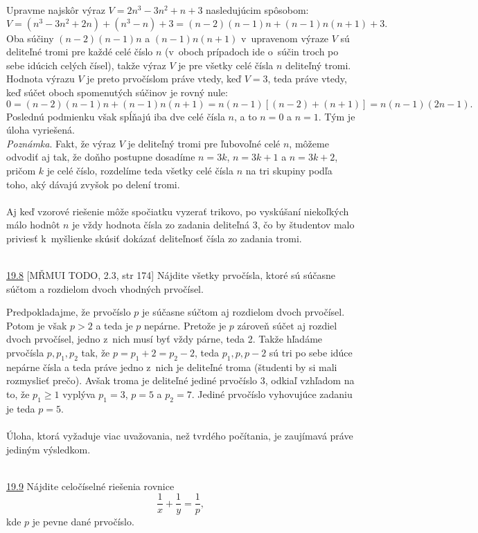 Upravme najskôr výraz $V = 2n^3 - 3n^2 + n + 3$ nasledujúcim spôsobom:
$$V = (n^3 - 3n^2+ 2n) + (n^3 - n) + 3 = (n - 2)(n - 1)n + (n - 1)n(n + 1) + 3.$$
Oba súčiny $(n-2)(n-1)n$ a $(n-1)n(n+1)$ v~upravenom výraze $V$ sú deliteľné tromi pre každé celé číslo $n$ (v~oboch prípadoch ide o~súčin troch po sebe idúcich celých čísel), takže výraz $V$ je pre všetky celé čísla $n$ deliteľný tromi. Hodnota výrazu $V$ je preto prvočíslom práve vtedy, keď $V = 3$, teda práve vtedy, keď súčet oboch spomenutých súčinov je rovný nule:
$$0 = (n - 2)(n - 1)n + (n - 1)n(n + 1) = n(n - 1)[(n - 2) + (n + 1)] = n(n - 1)(2n - 1).$$
Poslednú podmienku však spĺňajú iba dve celé čísla $n$, a to $n = 0$ a $n = 1$. Tým je úloha vyriešená.\\
\textit{Poznámka}. Fakt, že výraz $V$ je deliteľný tromi pre ľubovoľné celé $n$, môžeme odvodiť aj tak, že doňho postupne dosadíme $n = 3k$, $n = 3k + 1$ a $n = 3k + 2$, pričom $k$ je celé číslo, rozdelíme teda všetky celé čísla $n$ na tri skupiny podľa toho, aký dávajú zvyšok po delení tromi.\\
\\
\kom Aj keď vzorové riešenie môže spočiatku vyzerať trikovo, po vyskúšaní niekoľkých málo hodnôt $n$ je vždy hodnota čísla zo zadania deliteľná 3, čo by študentov malo priviesť k~myšlienke skúsiť dokázať deliteľnosť čísla zo zadania tromi.\\
\\
\begin{tcolorbox}[breakable,notitle,boxrule=0pt,colback=light-gray,colframe=light-gray]\ul{19.8} [MŘMUI TODO, 2.3, str 174] Nájdite všetky prvočísla, ktoré sú súčasne súčtom a rozdielom dvoch vhodných prvočísel.

\end{tcolorbox}

\rieh Predpokladajme, že prvočíslo $p$ je súčasne súčtom aj rozdielom dvoch prvočísel. Potom je však $p>2$ a teda je $p$ nepárne. Pretože je $p$ zároveň súčet aj rozdiel dvoch prvočísel, jedno z~nich musí byť vždy párne, teda 2. Takže hľadáme prvočísla $p, p_1, p_2$ tak, že $p=p_1+2=p_2-2$, teda $p_1, p, p-2$ sú tri po sebe idúce nepárne čísla a teda práve jedno z~nich je deliteľné troma (študenti by si mali rozmyslieť prečo). Avšak troma je deliteľné jediné prvočíslo 3, odkiaľ vzhľadom na to, že $p_1\geq 1$ vyplýva $p_1=3$, $p=5$ a $p_2=7$. Jediné prvočíslo vyhovujúce zadaniu je teda $p=5$.\\
\\
\kom Úloha, ktorá vyžaduje viac uvažovania, než tvrdého počítania, je zaujímavá práve jediným výsledkom.\\
\\
\begin{tcolorbox}[breakable,notitle,boxrule=0pt,colback=light-gray,colframe=light-gray]\ul{19.9} \cite[str. 95]{thiele1986} Nájdite celočíselné riešenia rovnice $$\frac{1}{x}+\frac{1}{y}=\frac{1}{p},$$ kde $p$ je pevne dané prvočíslo.

\end{tcolorbox}

